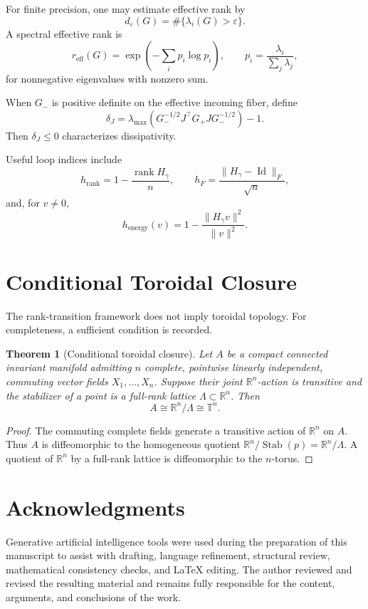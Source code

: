 \documentclass[11pt]{article}
\newtheorem{theorem}{Theorem}[section]
\newcommand{\R}{\mathbb{R}}
\newcommand{\Id}{\operatorname{Id}}
\newcommand{\rank}{\operatorname{rank}}
\newcommand{\Stab}{\operatorname{Stab}}
\begin{document}
For finite precision, one may estimate effective rank by
\[
d_\varepsilon(G)=\#\{\lambda_i(G)>\varepsilon\}.
\]
A spectral effective rank is
\[
r_{\mathrm{eff}}(G)
=\exp\!\left(-\sum_i p_i\log p_i\right),
\qquad
p_i=\frac{\lambda_i}{\sum_j\lambda_j},
\]
for nonnegative eigenvalues with nonzero sum.

When $G_-$ is positive definite on the effective incoming fiber, define
\[
\delta_J
=\lambda_{\max}\!\left(
G_-^{-1/2}J^\top G_+JG_-^{-1/2}
\right)-1.
\]
Then $\delta_J\le0$ characterizes dissipativity.

Useful loop indices include
\[
h_{\mathrm{rank}}=1-\frac{\rank H_\gamma}{n},
\qquad
h_F=\frac{\|H_\gamma-\Id\|_F}{\sqrt n},
\]
and, for $v\ne0$,
\[
h_{\mathrm{energy}}(v)
=1-\frac{\|H_\gamma v\|^2}{\|v\|^2}.
\]

\section{Conditional Toroidal Closure}

The rank-transition framework does not imply toroidal topology. For
completeness, a sufficient condition is recorded.

\begin{theorem}[Conditional toroidal closure]
Let $A$ be a compact connected invariant manifold admitting $n$ complete,
pointwise linearly independent, commuting vector fields
$X_1,\ldots,X_n$. Suppose their joint $\R^n$-action is transitive and the
stabilizer of a point is a full-rank lattice $\Lambda\subset\R^n$. Then
\[
A\cong\R^n/\Lambda\cong\mathbb T^n.
\]
\end{theorem}

\begin{proof}
The commuting complete fields generate a transitive action of $\R^n$ on $A$.
Thus $A$ is diffeomorphic to the homogeneous quotient
$\R^n/\Stab(p)=\R^n/\Lambda$. A quotient of $\R^n$ by a full-rank lattice is
diffeomorphic to the $n$-torus.
\end{proof}

\section*{Acknowledgments}

Generative artificial intelligence tools were used during the preparation of
this manuscript to assist with drafting, language refinement, structural
review, mathematical consistency checks, and \LaTeX{} editing. The author
reviewed and revised the resulting material and remains fully responsible for
the content, arguments, and conclusions of the work.
\end{document}
